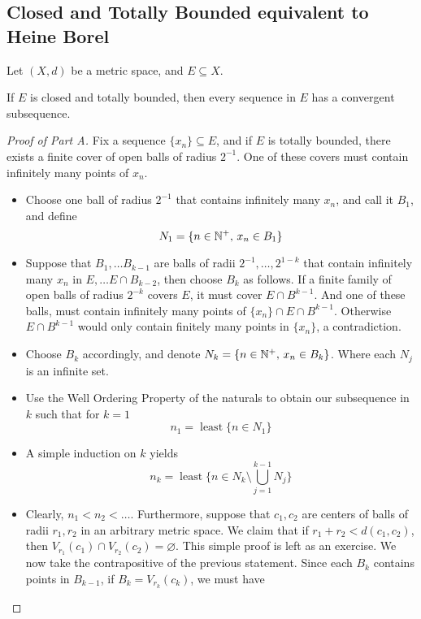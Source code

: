 \documentclass[../../main.tex]{subfiles}
\begin{document}
\subsection{Closed and Totally Bounded equivalent to Heine Borel}
Let $(X,d)$ be a metric space, and $E\subseteq X$.
\begin{wts}
    If $E$ is closed and totally bounded, then every sequence in $E$ has a convergent subsequence.
\end{wts}
\begin{proof}[Proof of Part A]
    Fix a sequence $\{x_n\}\subseteq E$, and if $E$ is totally bounded, there exists a finite cover of open balls of radius $2^{-1}$. One of these covers must contain infinitely many points of $x_n$. 
    \begin{itemize}
        \item Choose one ball of radius $2^{-1}$ that contains infinitely many $x_n$, and call it $B_1$, and define
        \[
        N_1 = \{n\in\mathbb{N}^+,\, x_n\in B_1\}
        \]
        \item Suppose that $B_1,\ldots B_{k-1}$ are balls of radii $2^{-1},\ldots,2^{1-k}$ that contain infinitely many $x_n$ in $E,\ldots E\cap B_{k-2}$, then choose $B_k$ as follows. If a finite family of open balls of radius $2^{-k}$ covers $E$, it must cover $E\cap B^{k-1}$. And one of these balls, must contain infinitely many points of $\{x_n\}\cap E\cap B^{k-1}$. Otherwise $E\cap B^{k-1}$ would only contain finitely many points in $\{x_n\}$, a contradiction.
        \item Choose $B_k$ accordingly, and denote $N_k = \{n\in\mathbb{N}^+,\, x_n\in B_k\}$. Where each $N_j$ is an infinite set.
        \item Use the Well Ordering Property of the naturals to obtain our subsequence in $k$ such that for $k=1$
        \[
        n_1 = \operatorname{least}\biggl\{n\in N_1\biggr\}
        \]
        \item A simple induction on $k$ yields
        \[
        n_k = \operatorname{least}\biggl\{n\in N_k\setminus \bigcup^{k-1}_{j=1}N_j\biggr\}
        \]
        \item Clearly, $n_1<n_2<\ldots$. Furthermore, suppose that $c_1, c_2$ are centers of balls of radii $r_1, r_2$ in an arbitrary metric space. We claim that if $r_1 + r_2< d(c_1,c_2)$, then $V_{r_1}(c_1)\cap V_{r_2}(c_2)=\varnothing$. This simple proof is left as an exercise. We now take the contrapositive of the previous statement. Since each $B_k$ contains points in $B_{k-1}$, if $B_k = V_{r_k}(c_k)$, we must have

\end{itemize}
\end{proof}
\end{document}
